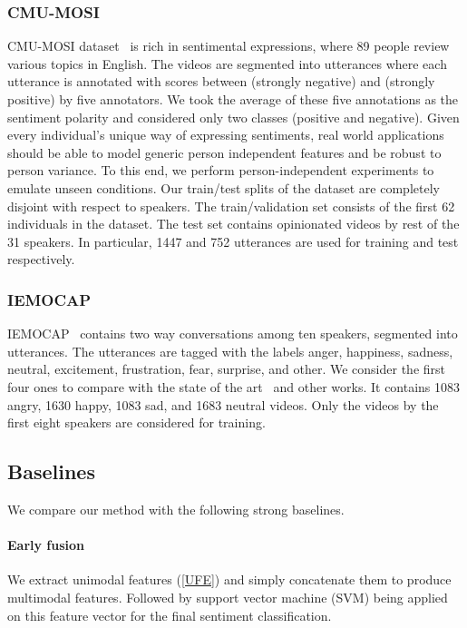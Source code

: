 \documentclass[review]{elsarticle}
\newcommand\?[1]{\hl{#1}}
\begin{document}
\subsubsection{CMU-MOSI}
\label{sec:mosi}
CMU-MOSI dataset~\citep{zadeh2016multimodal} is rich in sentimental
expressions, where 89 people review various topics in English. The videos are
segmented into utterances where each utterance is annotated with scores between
 (strongly negative) and  (strongly positive) by five annotators. We
took the average of these five annotations as the sentiment polarity and
considered only two classes (positive and negative). Given every individual's
unique way of expressing sentiments, real world applications should be able to
model generic person independent features and be robust to person variance. To
this end, we perform person-independent experiments to emulate unseen
conditions. Our train/test splits of the dataset are completely disjoint with
respect to speakers. The train/validation set consists of the first 62
individuals in the dataset. The test set contains opinionated videos by rest of
the 31 speakers. In particular, 1447 and 752 utterances are used for training
and test respectively.

\subsubsection{IEMOCAP}
\label{sec:iemocap}
IEMOCAP~\citep{iemocap} contains two way conversations
among ten speakers, segmented into utterances. The utterances are tagged with
the labels anger, happiness, sadness, neutral, excitement, frustration, fear,
surprise, and other. We consider the first four ones to compare with the
state of the art~\citep{porcon} and other works. It contains 1083
angry, 1630 happy, 1083 sad, and 1683 neutral videos. Only the videos by the
first eight speakers are considered for training.

\subsection{Baselines}
We compare our method with the following strong baselines.

\paragraph{Early fusion}
\label{early-fusion}
We extract unimodal features (\cref{UFE}) and simply concatenate them to
produce multimodal features. Followed by support vector machine (SVM)
being applied on this feature vector for the final sentiment
classification.
\end{document}
